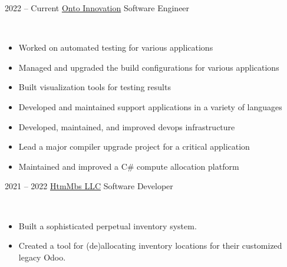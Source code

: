 \documentclass[9pt]{developercv} %
\begin{document}
\begin{entrylist}
    \entry
        {2022 -- Current}
        {\href{https://ontoinnovation.com/}{Onto Innovation}}
        {Software Engineer}
        {
            \slashsep
            \slashsep
            \slashsep
            \slashsep 
            \slashsep
            \slashsep
            \slashsep
            \\
            \begin{itemize}[leftmargin=*, noitemsep]
            \item Worked on automated testing for various applications
            \item Managed and upgraded the build configurations for various applications
            \item Built visualization tools for testing results
            \item Developed and maintained support applications in a variety of languages
            \item Developed, maintained, and improved devops infrastructure
            \item Lead a major compiler upgrade project for a critical application
            \item Maintained and improved a C\# compute allocation platform
            \end{itemize}
        }
    \entry
        {2021 -- 2022}
        {\href{https://mbs-standoffs.com}{HtmMbs LLC}}
        {Software Developer}
        {
            \slashsep
            \slashsep
            \slashsep
            \slashsep
            \slashsep
            \slashsep
            \\
            \begin{itemize}[leftmargin=*, noitemsep]
            \item Built a sophisticated perpetual inventory system.
            \item Created a tool for (de)allocating inventory locations for their customized legacy Odoo.

\end{itemize}}
\end{entrylist}
\end{document}

